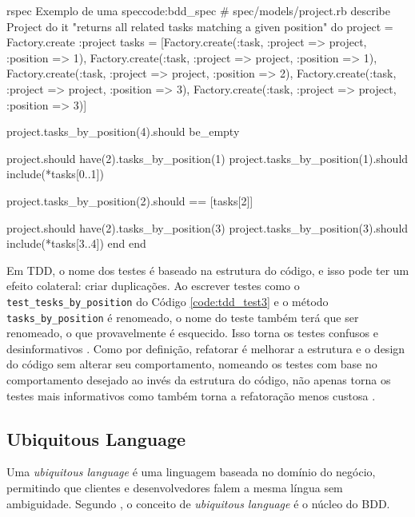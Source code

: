 \begin{mycode}{rspec}%
{Exemplo de uma spec}{code:bdd_spec}
# spec/models/project.rb
describe Project do
  it "returns all related tasks matching a given position" do
    project = Factory.create :project
    tasks = [Factory.create(:task, :project => project, :position => 1),
             Factory.create(:task, :project => project, :position => 1),
             Factory.create(:task, :project => project, :position => 2),
             Factory.create(:task, :project => project, :position => 3),
             Factory.create(:task, :project => project, :position => 3)]

    project.tasks_by_position(4).should be_empty

    project.should have(2).tasks_by_position(1)
    project.tasks_by_position(1).should include(*tasks[0..1])

    project.tasks_by_position(2).should == [tasks[2]]

    project.should have(2).tasks_by_position(3)
    project.tasks_by_position(3).should include(*tasks[3..4])
  end
end
\end{mycode}

Em TDD, o nome dos testes é baseado na estrutura do código, e isso pode ter um efeito colateral: criar duplicações. Ao escrever testes como o \texttt{test\_tesks\_by\_position} do Código \ref{code:tdd_test3} e o método \texttt{tasks\_by\_position} é renomeado, o nome do teste também terá que ser renomeado, o que provavelmente é esquecido. Isso torna os testes confusos e desinformativos \cite{ContinuousTesting}. Como por definição, refatorar é melhorar a estrutura e o design do código sem alterar seu comportamento, nomeando os testes com base no comportamento desejado ao invés da estrutura do código, não apenas torna os testes mais informativos como também torna a refatoração menos custosa \cite{ContinuousTesting}.


\subsection{Ubiquitous Language} %
\label{sub:ubiquitous_language}

Uma \textit{ubiquitous language} é uma linguagem baseada no domínio do negócio, permitindo que clientes e desenvolvedores falem a mesma língua sem ambiguidade. Segundo , o conceito de \textit{ubiquitous language} é o núcleo do BDD.


